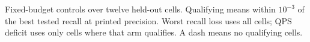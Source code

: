 \begin{table}[tbp]
\centering
\caption[Fixed-budget quality and throughput controls]{Fixed-budget controls over twelve held-out cells. Qualifying means
within $10^{-3}$ of the best tested recall at printed precision. Worst
recall loss uses all cells; QPS deficit uses only cells where that arm
qualifies. A dash means no qualifying cells.}
\label{tab:7-fixed-budget}
\small

\end{table}
